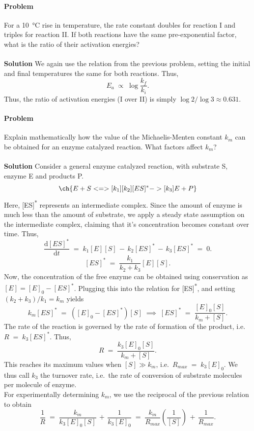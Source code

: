 \documentclass[10pt]{article}
\newcounter{prob}
\def\problem{\stepcounter{prob}\paragraph{Problem \arabic{prob}}}
\def\solution{\\\\\textbf{Solution }}
\begin{document}
        \problem For a \SI{10}{\celsius} rise in temperature, the rate constant doubles for reaction I and triples for reaction II.
        If both reactions have the same pre-exponential factor, what is the ratio of their activation energies?
        \solution We again use the relation from the previous problem, setting the initial and final temperatures the same for both reactions. Thus,
        \[
        E_a \;\propto\; \log\frac{k_f}{k_i}.
        \]
        Thus, the ratio of activation energies (I over II) is simply $\log{2} /\log{3} \approx 0.631$.

        \problem Explain mathematically how the value of the Michaelis-Menten constant $k_m$ can be obtained for an enzyme catalyzed reaction.
        What factors affect $k_m$?
        \solution Consider a general enzyme catalyzed reaction, with substrate S, enzyme E and products P.
        \[
        \ch{E + S <=>[ k_1 ][ k_2 ] [ES]^* ->[ k_3 ] E + P}
        \]
        Here, [ES]\textsuperscript{*} represents an intermediate complex. Since the amount of enzyme is much less than the amount of substrate,
        we apply a steady state assumption on the intermediate complex, claiming that it's concentration becomes constant over time.
        Thus,
        \[
        \frac{\mathrm{d} [ES]^*}{\mathrm{d}t} \;=\; k_1[E][S] \,-\, k_2 [ES]^* \,-\, k_3[ES]^* \;=\; 0.
        \]
        \[
        [ES]^* \;=\; \frac{k_1}{k_2 + k_3}[E][S].
        \]
        Now, the concentration of the free enzyme can be obtained using conservation as $[E] = [E]_0 - [ES]^*$.
        Plugging this into the relation for [ES]\textsuperscript{*}, and setting $(k_2 + k_3)/ k_1 = k_m$ yields
        \[
        k_m[ES]^* \;=\; ([E]_0 - [ES]^*)[S] \;\implies\; [ES]^* \;=\; \frac{[E]_0 [S]}{k_m + [S]}.
        \]
        The rate of the reaction is governed by the rate of formation of the product, i.e.\ $R \;=\; k_3 [ES]^*$.
        Thus,
        \[
        R \;=\; \frac{k_3 [E]_0 [S]}{k_m + [S]}.
        \]
        This reaches its maximum values when $[S] \gg k_m$, i.e.\ $R_{max} \;=\; k_3 [E]_0$.
        We thus call $k_3$ the turnover rate, i.e.\ the rate of conversion of substrate molecules per molecule of enzyme.\\

        For experimentally determining $k_m$, we use the reciprocal of the previous relation to obtain
        \[
        \frac{1}{R} \;=\; \frac{k_m}{k_3 [E]_0[S]} \,+\, \frac{1}{k_3[E]_0} \;=\; \frac{k_m}{R_{max}} \left( \frac{1}{[S]} \right) \,+\, \frac{1}{R_{max}}.
        \]
\end{document}
